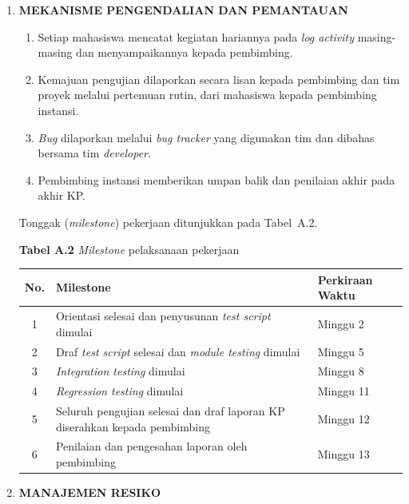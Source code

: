 \begin{framed}
\begin{enumerate}[label=\arabic*.,leftmargin=1.2cm,itemsep=6pt]
\item \textbf{MEKANISME PENGENDALIAN DAN PEMANTAUAN}

\begin{enumerate}[label=\arabic*)]
\item Setiap mahasiswa mencatat kegiatan hariannya pada \textit{log activity} masing-masing dan menyampaikannya kepada pembimbing.
\item Kemajuan pengujian dilaporkan secara lisan kepada pembimbing dan tim proyek melalui pertemuan rutin, dari mahasiswa kepada pembimbing instansi.
\item \textit{Bug} dilaporkan melalui \textit{bug tracker} yang digunakan tim dan dibahas bersama tim \textit{developer}.
\item Pembimbing instansi memberikan umpan balik dan penilaian akhir pada akhir KP.
\end{enumerate}

Tonggak (\textit{milestone}) pekerjaan ditunjukkan pada Tabel~A.2.

\begin{center}
\textbf{Tabel A.2} \textit{Milestone} pelaksanaan pekerjaan\\[4pt]
\small
\begin{tabularx}{\linewidth}{|c|X|p{3.3cm}|}
\hline
\textbf{No.} & \textbf{Milestone} & \textbf{Perkiraan Waktu} \\
\hline
1 & Orientasi selesai dan penyusunan \textit{test script} dimulai & Minggu 2 \\
\hline
2 & Draf \textit{test script} selesai dan \textit{module testing} dimulai & Minggu 5 \\
\hline
3 & \textit{Integration testing} dimulai & Minggu 8 \\
\hline
4 & \textit{Regression testing} dimulai & Minggu 11 \\
\hline
5 & Seluruh pengujian selesai dan draf laporan KP diserahkan kepada pembimbing & Minggu 12 \\
\hline
6 & Penilaian dan pengesahan laporan oleh pembimbing & Minggu 13 \\
\hline
\end{tabularx}
\end{center}

\item \textbf{MANAJEMEN RESIKO}


\end{enumerate}
\end{framed}
